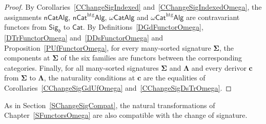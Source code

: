 \documentclass[a4paper, reqno]{amsbook}
\newcommand{\sig}[1]{\mathbf{#1}}             %
\newcommand{\htg}{\mathrm{htg}}                %
\theoremstyle{plain}
\theoremstyle{definition}
\begin{document}
\begin{proof}
By Corollaries~\ref{CChangeSigIndexed} and~\ref{CChangeSigIndexedOmega}, the assignments $\mathsf{nCatAlg}$, $\mathsf{nCat}^{\htg}\mathsf{Alg}$, $\omega\mathsf{CatAlg}$ and $\omega\mathsf{Cat}^{\htg}\mathsf{Alg}$ are contravariant functors from $\mathsf{Sig}_{\mathfrak{d}}$ to $\mathsf{Cat}$.
By Definitions~\ref{DGdFunctorOmega}, \ref{DTrFunctorOmega} and~\ref{DDsFunctorOmega} and Proposition~\ref{PUfFunctorOmega}, for every many-sorted signature $\sig{\Sigma}$, the components at $\sig{\Sigma}$ of the six families are functors between the corresponding categories.
Finally, for all many-sorted signatures $\sig{\Sigma}$ and $\sig{\Lambda}$ and every derivor $\mathbf{c}$ from $\sig{\Sigma}$ to $\sig{\Lambda}$, the naturality conditions at $\mathbf{c}$ are the equalities of Corollaries~\ref{CChangeSigGdUfOmega} and~\ref{CChangeSigDsTrOmega}.
\end{proof}

As in Section~\ref{SChangeSigCompat}, the natural transformations of Chapter~\ref{SFunctorsOmega} are also compatible with the change of signature.
\end{document}
